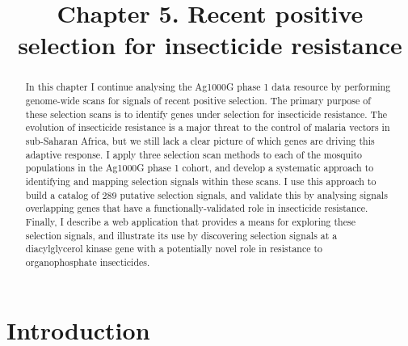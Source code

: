 \documentclass[a4paper,11pt,abstracton,hidelinks]{scrartcl}
\title{
Chapter 5. Recent positive selection for insecticide resistance
}
\author{}
\begin{document}
\renewcommand{\abstractname}{Summary}


\maketitle


\begin{abstract}


In this chapter I continue analysing the Ag1000G phase 1 data resource by performing genome-wide scans for signals of recent positive selection.
%
The primary purpose of these selection scans is to identify genes under selection for insecticide resistance.
%
The evolution of insecticide resistance is a major threat to the control of malaria vectors in sub-Saharan Africa, but we still lack a clear picture of which genes are driving this adaptive response.
%
I apply three selection scan methods to each of the mosquito populations in the Ag1000G phase 1 cohort, and develop a systematic approach to identifying and mapping selection signals within these scans.
%
I use this approach to build a catalog of 289 putative selection signals, and validate this by analysing signals overlapping genes that have a functionally-validated role in insecticide resistance.
%
Finally, I describe a web application that provides a means for exploring these selection signals, and illustrate its use by discovering selection signals at a diacylglycerol kinase gene with a potentially novel role in resistance to organophosphate insecticides.


\end{abstract}


\tableofcontents


\section{Introduction}\label{sec:introduction}


\end{document}

